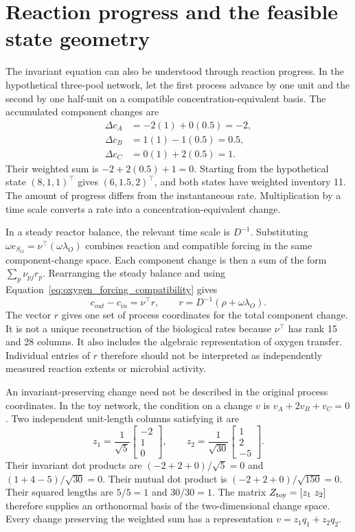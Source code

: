 \section{Reaction progress and the feasible state geometry}

The invariant equation can also be understood through reaction progress. In the hypothetical three-pool network, let the first process advance by one unit and the second by one half-unit on a compatible concentration-equivalent basis. The accumulated component changes are
\[
\begin{aligned}
\Delta c_A&=-2(1)+0(0.5)=-2,\\
\Delta c_B&=1(1)-1(0.5)=0.5,\\
\Delta c_C&=0(1)+2(0.5)=1.
\end{aligned}
\]
Their weighted sum is $-2+2(0.5)+1=0$. Starting from the hypothetical state $(8,1,1)^\top$ gives $(6,1.5,2)^\top$, and both states have weighted inventory 11. The amount of progress differs from the instantaneous rate. Multiplication by a time scale converts a rate into a concentration-equivalent change.

In a steady reactor balance, the relevant time scale is $D^{-1}$. Substituting $\omega e_{S_O}=\nu^\top(\omega\lambda_O)$ combines reaction and compatible forcing in the same component-change space. Each component change is then a sum of the form $\sum_p\nu_{pj}r_p$. Rearranging the steady balance and using Equation~\eqref{eq:oxygen_forcing_compatibility} gives
\begin{equation}
c_{out}-c_{in}=\nu^\top r,\qquad
r=D^{-1}(\rho+\omega\lambda_O).
\label{eq:reaction_progress_coordinates}
\end{equation}
The vector $r$ gives one set of process coordinates for the total component change. It is not a unique reconstruction of the biological rates because $\nu^\top$ has rank 15 and 28 columns. It also includes the algebraic representation of oxygen transfer. Individual entries of $r$ therefore should not be interpreted as independently measured reaction extents or microbial activity.

An invariant-preserving change need not be described in the original process coordinates. In the toy network, the condition on a change $v$ is $v_A+2v_B+v_C=0$. Two independent unit-length columns satisfying it are
\[
z_1=\frac1{\sqrt5}\begin{bmatrix}-2\\1\\0\end{bmatrix},\qquad
z_2=\frac1{\sqrt{30}}\begin{bmatrix}1\\2\\-5\end{bmatrix}.
\]
Their invariant dot products are $(-2+2+0)/\sqrt5=0$ and $(1+4-5)/\sqrt{30}=0$. Their mutual dot product is $(-2+2+0)/\sqrt{150}=0$. Their squared lengths are $5/5=1$ and $30/30=1$. The matrix $Z_{\rm toy}=[z_1\ z_2]$ therefore supplies an orthonormal basis of the two-dimensional change space. Every change preserving the weighted sum has a representation $v=z_1q_1+z_2q_2$.

